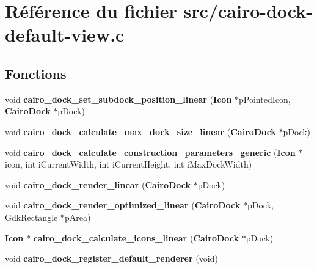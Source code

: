 \section{R\'{e}f\'{e}rence du fichier src/cairo-dock-default-view.c}
\label{cairo-dock-default-view_8c}
\subsection*{Fonctions}
\begin{CompactItemize}
\item 
void {\bf cairo\_\-dock\_\-set\_\-subdock\_\-position\_\-linear} ({\bf Icon} $\ast$p\-Pointed\-Icon, {\bf Cairo\-Dock} $\ast$p\-Dock)
\item 
void {\bf cairo\_\-dock\_\-calculate\_\-max\_\-dock\_\-size\_\-linear} ({\bf Cairo\-Dock} $\ast$p\-Dock)
\item 
void {\bf cairo\_\-dock\_\-calculate\_\-construction\_\-parameters\_\-generic} ({\bf Icon} $\ast$icon, int i\-Current\-Width, int i\-Current\-Height, int i\-Max\-Dock\-Width)
\item 
void {\bf cairo\_\-dock\_\-render\_\-linear} ({\bf Cairo\-Dock} $\ast$p\-Dock)
\item 
void {\bf cairo\_\-dock\_\-render\_\-optimized\_\-linear} ({\bf Cairo\-Dock} $\ast$p\-Dock, Gdk\-Rectangle $\ast$p\-Area)
\item 
{\bf Icon} $\ast$ {\bf cairo\_\-dock\_\-calculate\_\-icons\_\-linear} ({\bf Cairo\-Dock} $\ast$p\-Dock)
\item 
void {\bf cairo\_\-dock\_\-register\_\-default\_\-renderer} (void)
\end{CompactItemize}
